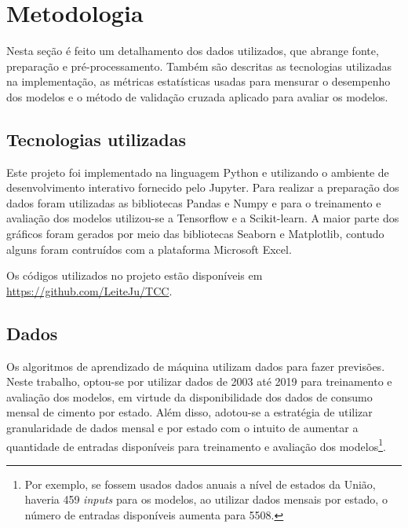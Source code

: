 
\chapter{Metodologia}



Nesta seção é feito um detalhamento dos dados utilizados, que 
abrange fonte, preparação e pré-processamento. Também são descritas as 
tecnologias utilizadas na implementação, as métricas estatísticas 
usadas para mensurar o desempenho dos modelos e o método de validação
cruzada aplicado para avaliar os modelos.

\section{Tecnologias utilizadas}

Este projeto foi implementado na linguagem Python e 
utilizando o ambiente de desenvolvimento interativo fornecido pelo Jupyter.
Para realizar a preparação dos dados foram utilizadas as bibliotecas Pandas e 
Numpy e para o treinamento e avaliação dos modelos utilizou-se a Tensorflow
e a Scikit-learn. A maior parte dos gráficos foram gerados por meio das bibliotecas 
Seaborn e Matplotlib, contudo alguns foram contruídos com a plataforma
Microsoft Excel.

Os códigos utilizados no projeto estão disponíveis em \url{https://github.com/LeiteJu/TCC}.

\section{Dados}
\label{sec:dados}

Os algoritmos de aprendizado de máquina utilizam dados para fazer 
previsões. 
Neste trabalho, optou-se por utilizar dados de 2003 até 2019 para treinamento e 
avaliação dos modelos, em virtude da disponibilidade dos dados de consumo mensal 
de cimento por estado. Além disso,
adotou-se a estratégia de utilizar granularidade de dados
mensal e por estado com o intuito de aumentar a quantidade de entradas disponíveis 
para treinamento e avaliação dos modelos\footnote{Por exemplo, se fossem usados dados 
anuais a nível de estados da União, haveria 459 \textit{inputs} para os modelos, ao 
utilizar dados mensais por estado, o número de entradas disponíveis aumenta para 5508.}.

